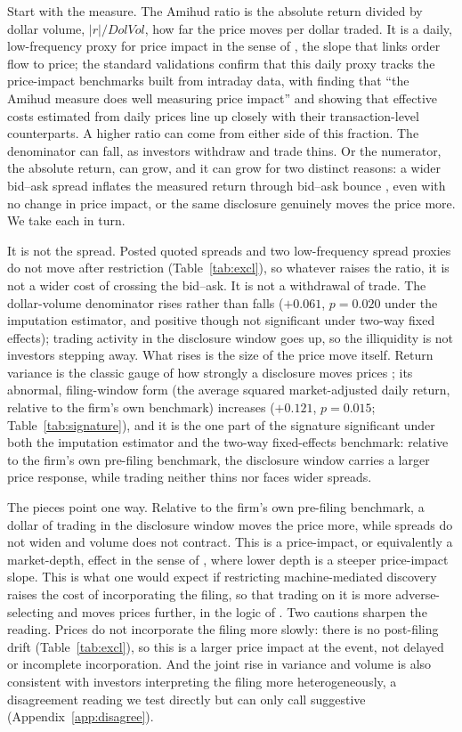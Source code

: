 \documentclass[12pt]{article}
\begin{document}
Start with the measure. The Amihud ratio \citep{Amihud2002} is the absolute return divided by dollar volume, $|r|/\mathit{DolVol}$, how far the price moves per dollar traded. It is a daily, low-frequency proxy for price impact in the sense of \citet{Kyle1985}, the slope that links order flow to price; the standard validations confirm that this daily proxy tracks the price-impact benchmarks built from intraday data, with \citet{GoyenkoHoldenTrzcinka2009} finding that ``the Amihud measure does well measuring price impact'' and \citet{Hasbrouck2009} showing that effective costs estimated from daily prices line up closely with their transaction-level counterparts. A higher ratio can come from either side of this fraction. The denominator can fall, as investors withdraw and trade thins. Or the numerator, the absolute return, can grow, and it can grow for two distinct reasons: a wider bid--ask spread inflates the measured return through bid--ask bounce \citep{Roll1984}, even with no change in price impact, or the same disclosure genuinely moves the price more. We take each in turn.

It is not the spread. Posted quoted spreads and two low-frequency spread proxies do not move after restriction (Table~\ref{tab:excl}), so whatever raises the ratio, it is not a wider cost of crossing the bid--ask. It is not a withdrawal of trade. The dollar-volume denominator rises rather than falls ($+0.061$, $p=0.020$ under the imputation estimator, and positive though not significant under two-way fixed effects); trading activity in the disclosure window goes up, so the illiquidity is not investors stepping away. What rises is the size of the price move itself. Return variance is the classic gauge of how strongly a disclosure moves prices \citep{Beaver1968}; its abnormal, filing-window form (the average squared market-adjusted daily return, relative to the firm's own benchmark) increases ($+0.121$, $p=0.015$; Table~\ref{tab:signature}), and it is the one part of the signature significant under both the imputation estimator and the two-way fixed-effects benchmark: relative to the firm's own pre-filing benchmark, the disclosure window carries a larger price response, while trading neither thins nor faces wider spreads.

The pieces point one way. Relative to the firm's own pre-filing benchmark, a dollar of trading in the disclosure window moves the price more, while spreads do not widen and volume does not contract. This is a price-impact, or equivalently a market-depth, effect in the sense of \citet{Kyle1985}, where lower depth is a steeper price-impact slope. This is what one would expect if restricting machine-mediated discovery raises the cost of incorporating the filing, so that trading on it is more adverse-selecting and moves prices further, in the logic of \citet{GlostenMilgrom1985}. Two cautions sharpen the reading. Prices do not incorporate the filing more slowly: there is no post-filing drift (Table~\ref{tab:excl}), so this is a larger price impact at the event, not delayed or incomplete incorporation. And the joint rise in variance and volume is also consistent with investors interpreting the filing more heterogeneously, a disagreement reading we test directly but can only call suggestive (Appendix~\ref{app:disagree}).
\end{document}
